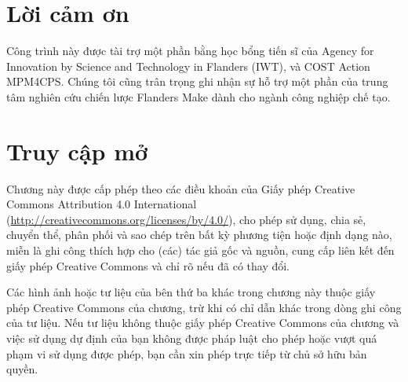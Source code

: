 \section*{Lời cảm ơn}
Công trình này được tài trợ một phần bằng học bổng tiến sĩ của Agency for Innovation by Science and Technology in Flanders (IWT), và COST Action MPM4CPS. Chúng tôi cũng trân trọng ghi nhận sự hỗ trợ một phần của trung tâm nghiên cứu chiến lược Flanders Make dành cho ngành công nghiệp chế tạo.

\section*{Truy cập mở}
Chương này được cấp phép theo các điều khoản của Giấy phép Creative Commons Attribution 4.0 International (\url{http://creativecommons.org/licenses/by/4.0/}), cho phép sử dụng, chia sẻ, chuyển thể, phân phối và sao chép trên bất kỳ phương tiện hoặc định dạng nào, miễn là ghi công thích hợp cho (các) tác giả gốc và nguồn, cung cấp liên kết đến giấy phép Creative Commons và chỉ rõ nếu đã có thay đổi.

Các hình ảnh hoặc tư liệu của bên thứ ba khác trong chương này thuộc giấy phép Creative Commons của chương, trừ khi có chỉ dẫn khác trong dòng ghi công của tư liệu. Nếu tư liệu không thuộc giấy phép Creative Commons của chương và việc sử dụng dự định của bạn không được pháp luật cho phép hoặc vượt quá phạm vi sử dụng được phép, bạn cần xin phép trực tiếp từ chủ sở hữu bản quyền.
